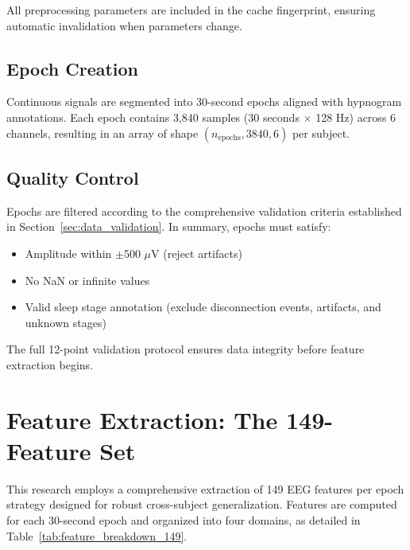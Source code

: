 \documentclass{imc-inf} %
\begin{document}
All preprocessing parameters are included in the cache fingerprint, ensuring automatic invalidation when parameters change.

\subsection{Epoch Creation}

Continuous signals are segmented into 30-second epochs aligned with hypnogram annotations. Each epoch contains 3,840 samples (30 seconds $\times$ 128 Hz) across 6 channels, resulting in an array of shape $(n_\text{epochs}, 3840, 6)$ per subject.

\subsection{Quality Control}

Epochs are filtered according to the comprehensive validation criteria established in Section~\ref{sec:data_validation}. In summary, epochs must satisfy:
\begin{itemize}
\item Amplitude within $\pm$500 $\mu$V (reject artifacts)
\item No NaN or infinite values
\item Valid sleep stage annotation (exclude disconnection events, artifacts, and unknown stages)
\end{itemize}

The full 12-point validation protocol ensures data integrity before feature extraction begins.

\section{Feature Extraction: The 149-Feature Set}
\label{sec:features}

This research employs a comprehensive extraction of 149 EEG features per epoch strategy designed for robust cross-subject generalization. Features are computed for each 30-second epoch and organized into four domains, as detailed in Table~\ref{tab:feature_breakdown_149}.
\end{document}
